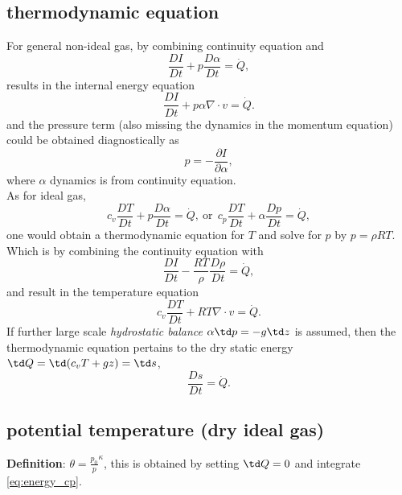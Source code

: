 \subsection{thermodynamic equation}
For general {\clr non-ideal gas}, by combining continuity equation and
\begin{equation}
    \frac{DI}{Dt} + p \frac{D\alpha}{Dt} = \dot{Q}, 
\end{equation}
results in the internal energy equation
\begin{equation}
    \boxed{\frac{DI}{Dt} + p\alpha \nabla \cdot v = \dot{Q}}.
\end{equation}
and the pressure term (also missing the dynamics in the momentum equation) could be obtained
diagnostically as
\begin{equation}
   p = -\frac{\partial I}{\partial \alpha},
\end{equation}
where $\alpha$ dynamics is from continuity equation. \\

As for {\clr ideal gas}, 
\begin{equation}
    c_v\frac{DT}{Dt} + p \frac{D\alpha}{Dt} = \dot{Q}, \ \text{or} \ \ 
    c_p\frac{DT}{Dt} + \alpha \frac{Dp}{Dt} = \dot{Q},
\end{equation}
one would obtain a thermodynamic equation for $T$ and solve for $p$ by $p = \rho R T$. Which is
by combining the continuity equation with
\begin{equation}
    \frac{DI}{Dt} - \frac{RT}{\rho} \frac{D\rho}{Dt} = \dot{Q},
\end{equation}
and result in the temperature equation
\begin{equation}
    \boxed{c_v\frac{DT}{Dt} + RT \nabla \cdot v = \dot{Q}}.
\end{equation}
If further large scale \emph{\clr hydrostatic balance} $\alpha \td p = -g \td z$ is assumed, then the
thermodynamic equation pertains to the dry static energy $\td Q = \td (c_v T + gz) = \td s$, 
\begin{equation}
   \boxed{\frac{Ds}{Dt} = \dot{Q}}.
\end{equation}

\subsection{potential temperature (dry ideal gas)}
{\bf{Definition}}: $\theta = \frac{p_0}{p}^\kappa$, this is obtained by setting $\td Q=0$ and
integrate \eqref{eq:energy_cp}. 

